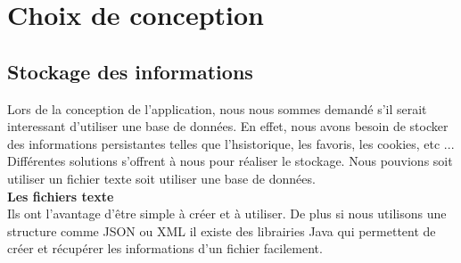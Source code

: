 \documentclass[10pt,a4paper]{article}
\begin{document}
\begin{landscape}
\begin{center}
\end{center}

\end{landscape}


\section{Choix de conception}
\subsection{Stockage des informations}
Lors de la conception de l'application, nous nous sommes demandé s'il serait interessant d'utiliser une base de données. En effet, nous avons besoin de stocker des informations persistantes telles que l'hsistorique, les favoris, les cookies, etc ... \\
Différentes solutions s'offrent à nous pour réaliser le stockage. Nous pouvions soit utiliser un fichier texte soit utiliser une base de données. \\

\textbf{Les fichiers texte} \\
Ils ont l'avantage d'être simple à créer et à utiliser. De plus si nous utilisons une structure comme JSON ou XML il existe des librairies Java qui permettent de créer et récupérer les informations d'un fichier facilement. \\
\end{document}
